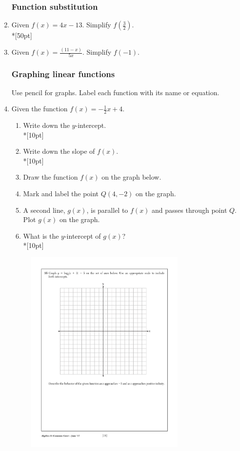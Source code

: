 \documentclass[12pt, oneside]{article}
\begin{document}
\begin{enumerate}
\subsubsection*{Function substitution}
\item Given $f(x)=4x-13$. Simplify $f(\frac{3}{2})$.\\*[50pt]
\item Given $\displaystyle f(x)=\frac{(11-x)}{5x}$. Simplify $f(-1)$.

\newpage
\subsubsection*{Graphing linear functions}
Use pencil for graphs. Label each function with its name or equation. 
\item Given the function $f(x)=-\frac{1}{2}x+4$. 
\begin{enumerate}
    \item Write down the $y$-intercept.\\*[10pt]
    \item Write down the slope of $f(x)$.\\*[10pt]
    \item Draw the function $f(x)$ on the graph below.
    \item Mark and label the point $Q (4, -2)$ on the graph.
    \item A second line, $g(x)$, is parallel to $f(x)$ and passes through point $Q$. Plot $g(x)$ on the graph.
    \item What is the $y$-intercept of $g(x)$?\\*[10pt]
\end{enumerate}

\begin{figure}[!ht]
    \centering
    \includegraphics[width=0.75\textwidth]{regents-grid.pdf}
\end{figure}


\end{enumerate}
\end{document}

